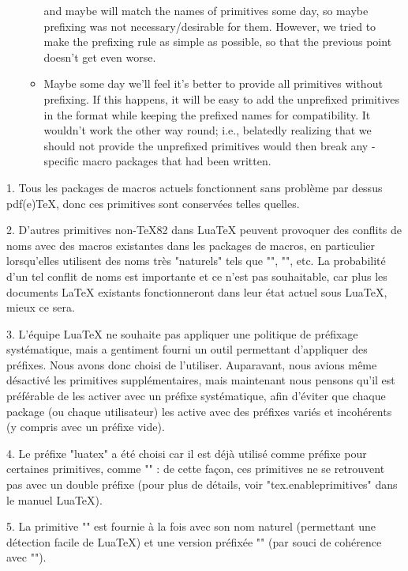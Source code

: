 \documentclass{lltxdoc}
\begin{document}
\begin{myquote}
\begin{enumerate}
\begin{itemize}
          and maybe will match the names of \xetex primitives some day, so
          maybe prefixing was not necessary/desirable for them. However, we
          tried to make the prefixing rule as simple as possible, so that
          the previous point doesn't get even worse.
        \item Maybe some day we'll feel it's better to provide all primitives
          without prefixing. If this happens, it will be easy to add the
          unprefixed primitives in the format while keeping the prefixed names
          for compatibility. It wouldn't work the other way round; i.e.,
          belatedly realizing that we should not provide the unprefixed
          primitives would then break any \luatex-specific macro packages
          that had been written.
      \end{itemize}
  \end{enumerate}
\end{myquote}

1. Tous les packages de macros actuels fonctionnent sans problème par dessus pdf(e)TeX, donc ces primitives sont conservées telles quelles.

2. D'autres primitives non-TeX82 dans LuaTeX peuvent provoquer des conflits de noms avec des macros existantes dans les packages de macros, en particulier lorsqu'elles utilisent des noms très "naturels" tels que "\outputbox", "\mathstyle", etc. La probabilité d'un tel conflit de noms est importante et ce n'est pas souhaitable, car plus les documents LaTeX existants fonctionneront dans leur état actuel sous LuaTeX, mieux ce sera.

3. L'équipe LuaTeX ne souhaite pas appliquer une politique de préfixage systématique, mais a gentiment fourni un outil permettant d'appliquer des préfixes. Nous avons donc choisi de l'utiliser. Auparavant, nous avions même désactivé les primitives supplémentaires, mais maintenant nous pensons qu'il est préférable de les activer avec un préfixe systématique, afin d'éviter que chaque package (ou chaque utilisateur) les active avec des préfixes variés et incohérents (y compris avec un préfixe vide).

4. Le préfixe "luatex" a été choisi car il est déjà utilisé comme préfixe pour certaines primitives, comme "\luatexversion" : de cette façon, ces primitives ne se retrouvent pas avec un double préfixe (pour plus de détails, voir "tex.enableprimitives" dans le manuel LuaTeX).

5. La primitive "\directlua" est fournie à la fois avec son nom naturel (permettant une détection facile de LuaTeX) et une version préfixée "\luatexdirectlua" (par souci de cohérence avec "\luatexlatelua").
\end{document}
